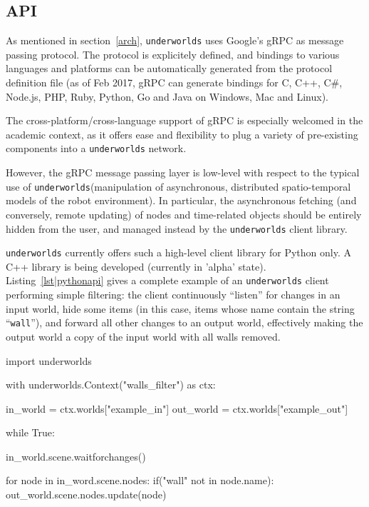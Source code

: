 \documentclass[letterpaper, 10 pt, conference]{ieeeconf}  %
\newcommand{\uwds}{{\tt underworlds}\xspace}
\begin{document}
\subsection{API}
\label{api}

As mentioned in section~\ref{arch}, \uwds uses Google's gRPC as message passing
protocol. The protocol is explicitely defined, and bindings to various languages
and platforms can be automatically generated from the protocol definition file
(as of Feb 2017, gRPC can generate bindings for C, C++, C\#, Node.js, PHP, Ruby,
Python, Go and Java on Windows, Mac and Linux).

The cross-platform/cross-language support of gRPC is especially welcomed in the
academic context, as it offers ease and flexibility to plug a variety of
pre-existing components into a \uwds network.


However, the gRPC message passing layer is low-level with respect to the typical
use of \uwds (manipulation of asynchronous, distributed spatio-temporal models
of the robot environment). In particular, the asynchronous fetching (and
conversely, remote updating) of nodes and time-related objects should be
entirely hidden from the user, and managed instead by the \uwds client library.

\uwds currently offers such a high-level client library for Python only. A C++
library is being developed (currently in 'alpha' state).
Listing~\ref{lst|pythonapi} gives a complete example of an \uwds client
performing simple filtering: the client continuously ``listen'' for changes in
an input world, hide some items (in this case, items whose name contain the
string ``{\tt wall}''), and forward all other changes to an output world,
effectively making the output world a copy of the input world with all walls
removed.

\begin{listing}[h!]

\begin{pythoncode}
import underworlds

with underworlds.Context("walls_filter") as ctx:

    in_world = ctx.worlds["example_in"]
    out_world = ctx.worlds["example_out"]

    while True:

        in_world.scene.waitforchanges()

        for node in in_word.scene.nodes:
            if("wall" not in node.name):
                out_world.scene.nodes.update(node)


\end{pythoncode}
    \caption{Example of a simple \uwds Python client named {\tt walls\_filter}:
    the client connects to the \uwds network, efficiently accesses the world
    {\tt example\_in}, filter out some objects, and publish the remaining
    objects in the world {\tt example\_out}.} \label{lst|pythonapi}
\end{listing}
\end{document}
